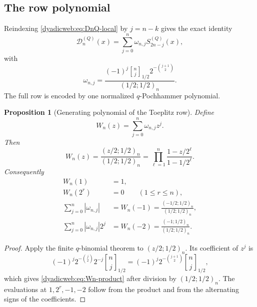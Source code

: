 \documentclass[11pt,oneside]{article}
\newtheorem{proposition}[proposition]{Proposition}
\theoremstyle{definition}
\theoremstyle{remark}
\newcommand{\qbinom}[3]{\genfrac{[}{]}{0pt}{}{#1}{#2}_{#3}}
\begin{document}
\subsection{The row polynomial}

Reindexing \eqref{dyadicweb:eq:DnQ-local} by $j=n-k$ gives the exact identity
\begin{equation}
 \mathcal D_n^{(Q)}(x)=
 \sum_{j=0}^{n}\omega_{n,j}S_{2n-j}^{(Q)}(x),              \label{dyadicweb:eq:D-toeplitz-local}
\end{equation}
with
\begin{equation}
 \omega_{n,j}=
 \frac{(-1)^j\qbinom nj{1/2}2^{-\binom{j+1}{2}}}
 {(1/2;1/2)_n}.                                           \label{dyadicweb:eq:omega-local}
\end{equation}
The full row is encoded by one normalized $q$-Pochhammer polynomial.

\begin{proposition}[Generating polynomial of the Toeplitz row]
\label{dyadicweb:prop:Wn}
Define
\begin{equation}
 W_n(z)=\sum_{j=0}^{n}\omega_{n,j}z^j.                    \label{dyadicweb:eq:Wn-def}
\end{equation}
Then
\begin{equation}
 \boxed{
 W_n(z)=\frac{(z/2;1/2)_n}{(1/2;1/2)_n}
 =\prod_{\ell=1}^{n}\frac{1-z/2^\ell}{1-1/2^\ell}.}      \label{dyadicweb:eq:Wn-product}
\end{equation}
Consequently
\begin{align}
 W_n(1)&=1,                                                \label{dyadicweb:eq:Wn-one}\\
 W_n(2^r)&=0\qquad(1\le r\le n),                         \label{dyadicweb:eq:Wn-roots}\\
 \sum_{j=0}^{n}|\omega_{n,j}|
 &=W_n(-1)=\frac{(-1/2;1/2)_n}{(1/2;1/2)_n},              \label{dyadicweb:eq:Wn-variation}\\
 \sum_{j=0}^{n}|\omega_{n,j}|2^j
 &=W_n(-2)=\frac{(-1;1/2)_n}{(1/2;1/2)_n}.                \label{dyadicweb:eq:Wn-weighted-variation}
\end{align}
\end{proposition}

\begin{proof}
Apply the finite $q$-binomial theorem to $(z/2;1/2)_n$.  Its coefficient of $z^j$ is
\[
 (-1)^j2^{-\binom j2}2^{-j}\qbinom nj{1/2}
 =(-1)^j2^{-\binom{j+1}{2}}\qbinom nj{1/2},
\]
which gives \eqref{dyadicweb:eq:Wn-product} after division by $(1/2;1/2)_n$.  The evaluations at
$1,2^r,-1,-2$ follow from the product and from the alternating signs of the coefficients.
\end{proof}
\end{document}
